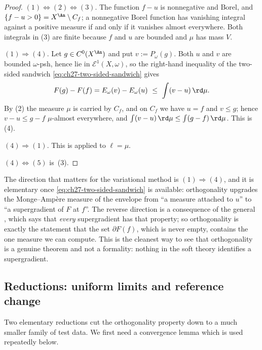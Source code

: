 \begin{proof}
$(1)\Leftrightarrow(2)\Leftrightarrow(3)$.  The function $f-u$ is
nonnegative and Borel, and $\{f-u>0\}=X^{\An}\setminus C_f$; a nonnegative
Borel function has vanishing integral against a positive measure if and only
if it vanishes almost everywhere.  Both integrals in (3) are finite because
$f$ and $u$ are bounded and $\mu$ has mass $V$.

$(1)\Rightarrow(4)$.  Let $g\in C^0(X^{\An})$ and put
$v:=P_\omega(g)$.  Both $u$ and $v$ are bounded $\omega$-psh, hence
lie in $\mathcal E^1(X,\omega)$, so the right-hand inequality of the
two-sided sandwich \eqref{eq:ch27-two-sided-sandwich} gives
\[
 F(g)-F(f)=E_\omega(v)-E_\omega(u)\ \leq\ \int(v-u)\,\rd\mu .
\]
By (2) the measure $\mu$ is carried by $C_f$, and on $C_f$ we have
$u=f$ and $v\leq g$; hence $v-u\leq g-f$ $\mu$-almost everywhere,
and $\int(v-u)\,\rd\mu\leq\int(g-f)\,\rd\mu$.  This is (4).

$(4)\Rightarrow(1)$.  This is
 applied to
$\ell=\mu$.

$(4)\Leftrightarrow(5)$ is
\,(3).
\end{proof}

\begin{remark}
\label{rem:ch27-orthogonality-asymmetry}
The direction that matters for the variational method is
$(1)\Rightarrow(4)$, and it is elementary once
\eqref{eq:ch27-two-sided-sandwich} is available: orthogonality upgrades the
Monge--Amp\`ere measure of the envelope from ``a measure attached to $u$''
to ``a supergradient of $F$ at $f$''.  The reverse direction is a
consequence of the general ,
which says that \emph{every} supergradient has that property; so
orthogonality is exactly the statement that the set
$\partial F(f)$, which is never empty, contains the one measure we can
compute.  This is the cleanest way to see that orthogonality is a genuine
theorem and not a formality: nothing in the soft theory identifies a
supergradient.
\end{remark}

\subsection{Reductions: uniform limits and reference change}
\label{sec:ch27-orthogonality-reductions}

Two elementary reductions cut the orthogonality property down to a much
smaller family of test data.  We first need a convergence lemma which is
used repeatedly below.

